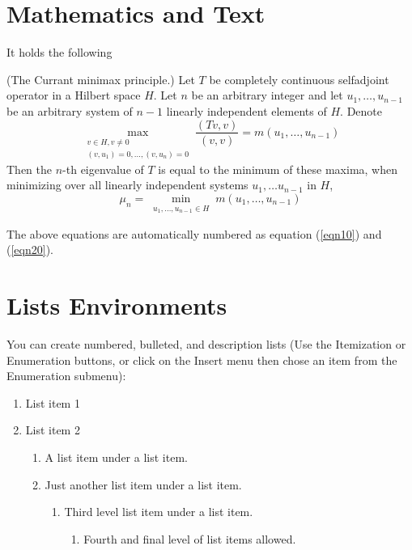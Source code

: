 \section{Mathematics and Text}

It holds \cite{KarelRektorys} the following
\begin{theorem}
(The Currant minimax principle.) Let $T$ be completely continuous selfadjoint operator
in a Hilbert space $H$. Let $n$ be an arbitrary integer and let $u_1,\ldots,u_{n-1}$ be
an arbitrary system of $n-1$ linearly independent elements of $H$. Denote
\begin{equation}
\max_{\substack{v\in H, v\neq
0\\(v,u_1)=0,\ldots,(v,u_n)=0}}\frac{(Tv,v)}{(v,v)}=m(u_1,\ldots, u_{n-1})
\label{eqn10}
\end{equation}
Then the $n$-th eigenvalue of $T$ is equal to the minimum of these maxima, when
minimizing over all linearly independent systems $u_1,\ldots u_{n-1}$ in $H$,
\begin{equation}
\mu_n = \min_{\substack{u_1,\ldots, u_{n-1}\in H}} m(u_1,\ldots, u_{n-1}) \label{eqn20}
\end{equation}
\end{theorem}
The above equations are automatically numbered as equation (\ref{eqn10}) and
(\ref{eqn20}).


\section{Lists Environments}

You can create numbered, bulleted, and description lists
(Use the Itemization or Enumeration buttons, or click on the Insert menu
then chose an item from the Enumeration submenu):

\begin{enumerate}
\item List item 1

\item List item 2

\begin{enumerate}
\item A list item under a list item.

\item Just another list item under a list item.

\begin{enumerate}
\item Third level list item under a list item.

\begin{enumerate}
\item Fourth and final level of list items allowed.
\end{enumerate}
\end{enumerate}
\end{enumerate}
\end{enumerate}

